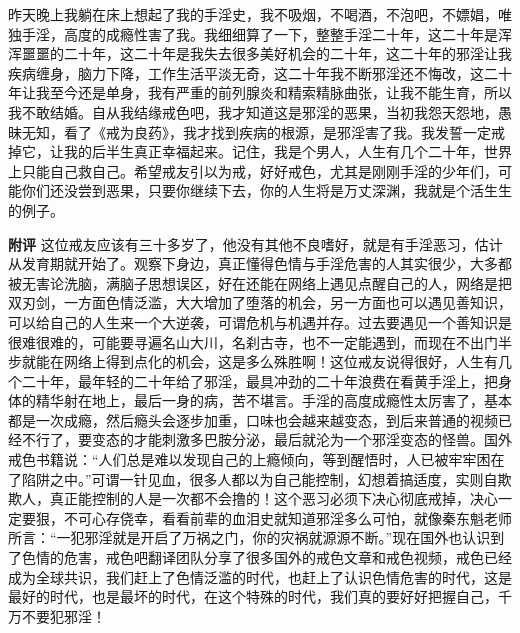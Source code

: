 \begin{case}
    昨天晚上我躺在床上想起了我的手淫史，我不吸烟，不喝酒，不泡吧，不嫖娼，唯独手淫，高度的成瘾性害了我。我细细算了一下，整整手淫二十年，这二十年是浑浑噩噩的二十年，这二十年是我失去很多美好机会的二十年，这二十年的邪淫让我疾病缠身，脑力下降，工作生活平淡无奇，这二十年我不断邪淫还不悔改，这二十年让我至今还是单身，我有严重的前列腺炎和精索精脉曲张，让我不能生育，所以我不敢结婚。自从我结缘戒色吧，我才知道这是邪淫的恶果，当初我怨天怨地，愚昧无知，看了《戒为良药》，我才找到疾病的根源，是邪淫害了我。我发誓一定戒掉它，让我的后半生真正幸福起来。记住，我是个男人，人生有几个二十年，世界上只能自己救自己。希望戒友引以为戒，好好戒色，尤其是刚刚手淫的少年们，可能你们还没尝到恶果，只要你继续下去，你的人生将是万丈深渊，我就是个活生生的例子。

    \textbf{附评} 这位戒友应该有三十多岁了，他没有其他不良嗜好，就是有手淫恶习，估计从发育期就开始了。观察下身边，真正懂得色情与手淫危害的人其实很少，大多都被无害论洗脑，满脑子思想误区，好在还能在网络上遇见点醒自己的人，网络是把双刃剑，一方面色情泛滥，大大增加了堕落的机会，另一方面也可以遇见善知识，可以给自己的人生来一个大逆袭，可谓危机与机遇并存。过去要遇见一个善知识是很难很难的，可能要寻遍名山大川，名刹古寺，也不一定能遇到，而现在不出门半步就能在网络上得到点化的机会，这是多么殊胜啊！这位戒友说得很好，人生有几个二十年，最年轻的二十年给了邪淫，最具冲劲的二十年浪费在看黄手淫上，把身体的精华射在地上，最后一身的病，苦不堪言。手淫的高度成瘾性太厉害了，基本都是一次成瘾，然后瘾头会逐步加重，口味也会越来越变态，到后来普通的视频已经不行了，要变态的才能刺激多巴胺分泌，最后就沦为一个邪淫变态的怪兽。国外戒色书籍说：“人们总是难以发现自己的上瘾倾向，等到醒悟时，人已被牢牢困在了陷阱之中。”可谓一针见血，很多人都以为自己能控制，幻想着搞适度，实则自欺欺人，真正能控制的人是一次都不会撸的！这个恶习必须下决心彻底戒掉，决心一定要狠，不可心存侥幸，看看前辈的血泪史就知道邪淫多么可怕，就像秦东魁老师所言：“一犯邪淫就是开启了万祸之门，你的灾祸就源源不断。”现在国外也认识到了色情的危害，戒色吧翻译团队分享了很多国外的戒色文章和戒色视频，戒色已经成为全球共识，我们赶上了色情泛滥的时代，也赶上了认识色情危害的时代，这是最好的时代，也是最坏的时代，在这个特殊的时代，我们真的要好好把握自己，千万不要犯邪淫！
\end{case}


